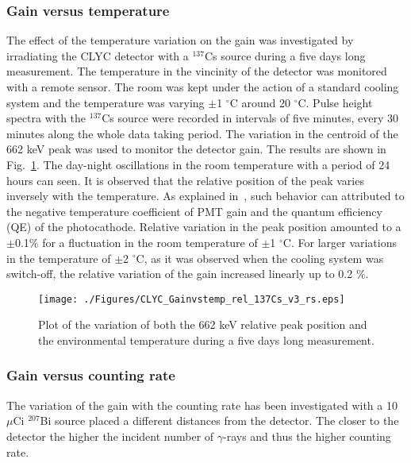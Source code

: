 \documentclass[review,number,sort&compress]{elsarticle}
\begin{document}
\subsubsection*{Gain versus temperature}
The effect of the temperature variation on the gain was investigated by irradiating the CLYC detector with a $^{137}$Cs source during a five days long measurement. The temperature in the vincinity of the detector was monitored with a remote sensor. The room was kept under the action of a standard cooling system and the temperature was varying $\pm$1 $^{\circ}$C around 20 $^{\circ}$C. Pulse height spectra with the $^{137}$Cs source were recorded in intervals of five minutes, every 30 minutes along the whole data taking period. The variation in the centroid of the 662 keV peak was used to monitor the detector gain. The results are shown in Fig.~\ref{temp}. The day-night oscillations in the room temperature with a period of 24 hours can seen. It is observed that the relative position of the peak varies inversely with the temperature. As explained in~\cite{Mos}, such behavior can attributed to the negative temperature coefficient of PMT gain and the quantum efficiency (QE) of the photocathode. Relative variation in the peak position amounted to a $\pm$0.1$\%$ for a fluctuation in the room temperature of $\pm$1 $^{\circ}$C. 
For larger variations in the temperature of $\pm$2 $^{\circ}$C, as it was observed when the cooling system was switch-off, the relative variation of the gain increased linearly up to 0.2 $\%$. 

\begin{figure}[h!]
\centering
\texttt{[image: ./Figures/CLYC\_Gainvstemp\_rel\_137Cs\_v3\_rs.eps]}
\caption{Plot of the variation of both the 662 keV relative peak position and the environmental temperature during a five days long measurement. }
\label{temp}
\end{figure}

 
\subsubsection*{Gain versus counting rate}
The variation of the gain with the counting rate has been investigated with a 10 $\mu$Ci $^{207}$Bi source placed a different distances from the detector. The closer to the detector the higher the incident number of $\gamma$-rays and thus the higher counting rate.
\end{document}
